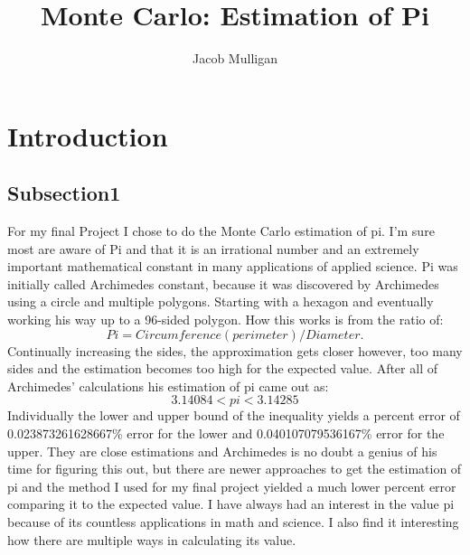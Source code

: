 \documentclass{llncs}
\begin{document}
\title{Monte Carlo: Estimation of Pi}

\author{Jacob Mulligan}

\maketitle

\section{Introduction}

\subsection{Subsection1} 	For my final Project I chose to do the Monte Carlo estimation of pi. I’m sure most are aware of Pi and that it is an irrational number and an extremely important mathematical constant in many applications of applied science. Pi was initially called Archimedes constant, because it was discovered by Archimedes using a circle and multiple polygons. Starting with a hexagon and eventually working his way up to a 96-sided polygon. How this works is from the ratio of:
\begin{equation}
Pi = Circumference(perimeter)/Diameter.
\end{equation}
Continually increasing the sides, the approximation gets closer however, too many sides and the estimation becomes too high for the expected value. After all of Archimedes’ calculations his estimation of pi came out as:
\begin{equation}
3.14084 < pi < 3.14285
\end{equation}
Individually the lower and upper bound of the inequality yields a percent error of 0.023873261628667\% error for the lower and 0.040107079536167\% error for the upper. They are close estimations and Archimedes is no doubt a genius of his time for figuring this out, but there are newer approaches to get the estimation of pi and the method I used for my final project yielded a much lower percent error comparing it to the expected value. 
I have always had an interest in the value pi because of its countless applications in math and science. I also find it interesting how there are multiple ways in calculating its value.\\
\end{document}
